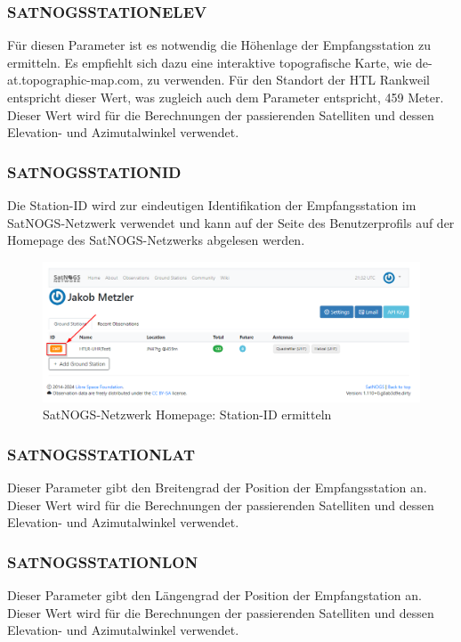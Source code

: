\subsubsection{SATNOGS\textunderscore STATION\textunderscore ELEV}
Für diesen Parameter ist es notwendig die Höhenlage der Empfangsstation zu ermitteln. Es empfiehlt sich dazu eine interaktive topografische Karte, wie de-at.topographic-map.com, zu verwenden. Für den Standort der HTL Rankweil entspricht dieser Wert, was zugleich auch dem Parameter entspricht, 459 Meter. Dieser Wert wird für die Berechnungen der passierenden Satelliten und dessen Elevation- und Azimutalwinkel verwendet.

\subsubsection{SATNOGS\textunderscore STATION\textunderscore ID}
Die Station-ID wird zur eindeutigen Identifikation der Empfangsstation im SatNOGS-Netzwerk verwendet und kann auf der Seite des Benutzerprofils auf der Homepage des SatNOGS-Netzwerks abgelesen werden. 

\begin{figure} [H]
	\centering
	\includegraphics[width=.75\linewidth]{../ref/stationid.png}
	\caption{SatNOGS-Netzwerk Homepage: Station-ID ermitteln}
	\label{fig:stationid}
\end{figure}

\subsubsection{SATNOGS\textunderscore STATION\textunderscore LAT}
Dieser Parameter gibt den Breitengrad der Position der Empfangsstation an. Dieser Wert wird für die Berechnungen der passierenden Satelliten und dessen Elevation- und Azimutalwinkel verwendet.

\subsubsection{SATNOGS\textunderscore STATION\textunderscore LON}
Dieser Parameter gibt den Längengrad der Position der Empfangstation an. Dieser Wert wird für die Berechnungen der passierenden Satelliten und dessen Elevation- und Azimutalwinkel verwendet.

